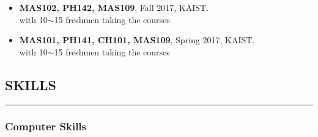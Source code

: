 \documentclass[10pt,a4]{article}
\begin{document}
\begin{small}
\begin{itemize}
\item {\bf MAS102, PH142, MAS109}, Fall 2017, KAIST. \\
with 10$\sim$15 freshmen taking the courses

\item {\bf MAS101, PH141, CH101, MAS109}, Spring 2017, KAIST. \\
with 10$\sim$15 freshmen taking the courses


\end{itemize}







\lhead{\textcolor{gray}{\it Junghyun Lee}}
\fancyfoot[C]{}

\subsection*{SKILLS}
\hrule
\vspace{0.2cm}

\subsubsection*{Computer Skills}


\end{small}
\end{document}
